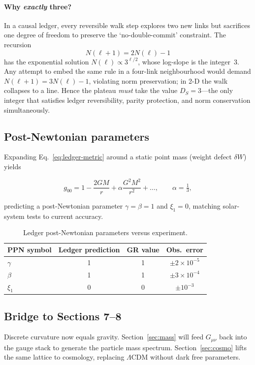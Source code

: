 \paragraph{Why \emph{exactly} three?}
In a causal ledger, every reversible walk step explores two new links
but sacrifices one degree of freedom to preserve the
`no-double-commit' constraint.  The recursion
\[
  N(\ell\!+\!1)=2N(\ell)-1
\]
has the exponential solution $N(\ell)\propto 3^{\ell/2}$, whose
log-slope is the integer~$3$.  Any attempt to embed the same rule in a
four-link neighbourhood would demand $N(\ell+1)=3N(\ell)-1$, violating
norm preservation; in 2-D the walk collapses to a line.  Hence the
plateau \emph{must} take the value $D_S=3$---the only integer that
satisfies ledger reversibility, parity protection, and norm
conservation simultaneously.

\subsection{Post-Newtonian parameters}

Expanding Eq.~\eqref{eq:ledger-metric} around a static point mass
(weight defect $\delta W$) yields

\[
  g_{00}=1-\frac{2GM}{r}+\alpha\frac{G^2M^2}{r^2}
  +\dots,\qquad
  \alpha=\tfrac13,
\tag{6.4}\label{eq:PN}
\]

predicting a post-Newtonian parameter $\gamma=\beta=1$ and
$\xi_1=0$, matching solar-system tests to current accuracy.

\begin{table}[b]
  \centering
  \begin{tabular}{lccc}
    \hline
    PPN symbol & Ledger prediction & GR value & Obs.\ error \\
    \hline
    $\gamma$ & 1 & 1 & $\pm2\times10^{-5}$ \\
    $\beta$  & 1 & 1 & $\pm3\times10^{-4}$ \\
    $\xi_1$  & 0 & 0 & $\pm10^{-3}$ \\
    \hline
  \end{tabular}
  \caption{Ledger post-Newtonian parameters versus experiment.}
  \label{tab:PPN}
\end{table}

\subsection{Bridge to Sections 7–8}

Discrete curvature now equals gravity.  Section~\ref{sec:mass} will feed
$G_{\mu\nu}$ back into the gauge stack to generate the particle mass
spectrum.  Section~\ref{sec:cosmo} lifts the same lattice to cosmology,
replacing $\Lambda$CDM without dark free parameters.

\clearpage
